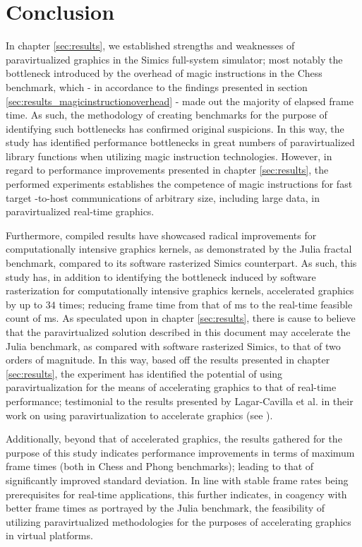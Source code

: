 
\section{Conclusion}
\label{sec:conclusion}

In chapter \ref{sec:results}, we established strengths and weaknesses of paravirtualized graphics in the Simics full-system simulator; most notably the bottleneck introduced by the overhead of magic instructions in the Chess benchmark, which - in accordance to the findings presented in section \ref{sec:results_magicinstructionoverhead} - made out the majority of elapsed frame time.
As such, the methodology of creating benchmarks for the purpose of identifying such bottlenecks has confirmed original suspicions.
In this way, the study has identified performance bottlenecks in great numbers of paravirtualized library functions when utilizing magic instruction technologies.
However, in regard to performance improvements presented in chapter \ref{sec:results}, the performed experiments establishes the competence of magic instructions for fast target -to-host communications of arbitrary size, including large data, in paravirtualized real-time graphics.

Furthermore, compiled results have showcased radical improvements for computationally intensive graphics kernels, as demonstrated by the Julia fractal benchmark, compared to its software rasterized Simics counterpart.
As such, this study has, in addition to identifying the bottleneck induced by software rasterization for computationally intensive graphics kernels, accelerated graphics by up to $34$ times; reducing frame time from that of  ms to the real-time feasible count of  ms.
As speculated upon in chapter \ref{sec:results}, there is cause to believe that the paravirtualized solution described in this document may accelerate the Julia benchmark, as compared with software rasterized Simics, to that of two orders of magnitude.
In this way, based off the results presented in chapter \ref{sec:results}, the experiment has identified the potential of using paravirtualization for the means of accelerating graphics to that of real-time performance; testimonial to the results presented by Lagar-Cavilla et al. in their work on using paravirtualization to accelerate graphics (see ).

Additionally, beyond that of accelerated graphics, the results gathered for the purpose of this study indicates performance improvements in terms of maximum frame times (both in Chess and Phong benchmarks); leading to that of significantly improved standard deviation.
In line with stable frame rates being prerequisites for real-time applications, this further indicates, in coagency with better frame times as portrayed by the Julia benchmark, the feasibility of utilizing paravirtualized methodologies for the purposes of accelerating graphics in virtual platforms.

